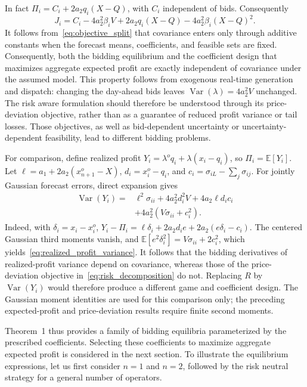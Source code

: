 \documentclass[journal]{IEEEtran}
\begin{document}
In fact $\Pi_i=C_i+2a_2q_i(X-Q)$, with $C_i$ independent of bids. Consequently
\begin{equation}
 J_i=C_i-4a_2^2\beta_iV+2a_2q_i(X-Q)
       -4a_2^2\beta_i(X-Q)^2. \label{eq:objective_split}
\end{equation}
It follows from~\eqref{eq:objective_split} that covariance enters only through additive constants when the forecast means, coefficients, and feasible sets are fixed. Consequently, both the bidding equilibrium and the coefficient design that maximizes aggregate expected profit are exactly independent of covariance under the assumed model. This property follows from exogenous real-time generation and dispatch: changing the day-ahead bids leaves $\operatorname{Var}(\lambda)=4a_2^2V$ unchanged. The risk aware formulation should therefore be understood through its price-deviation objective, rather than as a guarantee of reduced profit variance or tail losses. Those objectives, as well as bid-dependent uncertainty or uncertainty-dependent feasibility, lead to different bidding problems.

For comparison, define realized profit $Y_i=\lambda^o q_i+\lambda(x_i-q_i)$, so $\Pi_i=\mathbb E[Y_i]$. Let $\ell=a_1+2a_2(x_{n+1}^o-X)$, $d_i=x_i^o-q_i$, and $c_i=\sigma_{iL}-\sum_j\sigma_{ij}$. For jointly Gaussian forecast errors, direct expansion gives
\begin{equation}
\begin{aligned}
 \operatorname{Var}(Y_i)={}&\ell^2\sigma_{ii}+4a_2^2d_i^2V
       +4a_2\ell d_i c_i\\
       &+4a_2^2(V\sigma_{ii}+c_i^2).
\end{aligned}
\label{eq:realized_profit_variance}
\end{equation}
Indeed, with $\delta_i=x_i-x_i^o$,
$Y_i-\Pi_i=\ell\delta_i+2a_2d_i e+2a_2(e\delta_i-c_i)$.
The centered Gaussian third moments vanish, and $\mathbb E[e^2\delta_i^2]=V\sigma_{ii}+2c_i^2$, which yields~\eqref{eq:realized_profit_variance}. It follows that the bidding derivatives of realized-profit variance depend on covariance, whereas those of the price-deviation objective in~\eqref{eq:risk_decomposition} do not. Replacing $R$ by $\operatorname{Var}(Y_i)$ would therefore produce a different game and coefficient design. The Gaussian moment identities are used for this comparison only; the preceding expected-profit and price-deviation results require finite second moments.

Theorem~1 thus provides a family of bidding equilibria parameterized by the prescribed coefficients. Selecting these coefficients to maximize aggregate expected profit is considered in the next section. To illustrate the equilibrium expressions, let us first consider $n=1$ and $n=2$, followed by the risk neutral strategy for a general number of operators.
\end{document}
